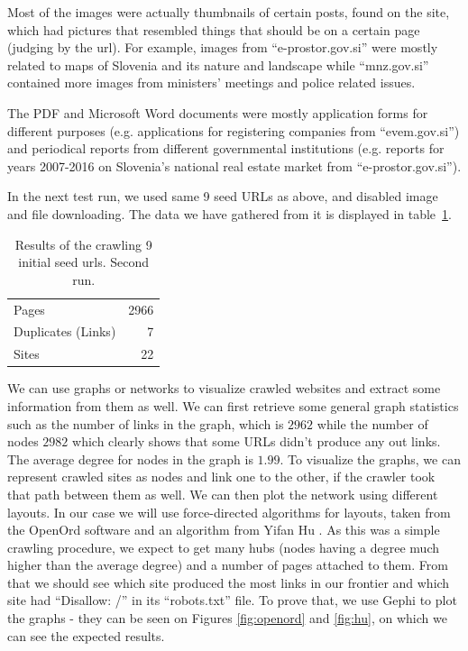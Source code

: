 \documentclass[9pt]{IEEEtran}
\begin{document}
Most of the images were actually thumbnails of certain posts, found on the site, which had pictures that resembled things that should be on a certain page (judging by the url).
For example, images from ``e-prostor.gov.si'' were mostly related to maps of Slovenia and its nature and landscape while ``mnz.gov.si'' contained more images from ministers' meetings and police related issues.

The PDF and Microsoft Word documents were mostly application forms for different purposes (e.g. applications for registering companies from ``evem.gov.si'') and periodical reports from different governmental institutions (e.g. reports for years 2007-2016 on Slovenia's national real estate market from ``e-prostor.gov.si'').

In the next test run, we used same 9 seed URLs as above, and disabled image and file downloading. The data we have gathered from it is displayed in table~\ref{tab:results2}.
\begin{table}[H]
    \begin{center}
    \caption{Results of the crawling 9 initial seed urls. Second run.}
        \begin{tabular}{ l | r }
        Pages & 2966 \\
        Duplicates (Links) & 7 \\
        Sites & 22 \\
        \end{tabular}
    \label{tab:results2}
    \end{center}
\end{table}



We can use graphs or networks to visualize crawled websites and extract some information from them as well.
We can first retrieve some general graph statistics such as the number of links in the graph, which is $2962$ while the number of nodes $2982$ which clearly shows that some URLs didn't produce any out links.
The average degree for nodes in the graph is $1.99$.
To visualize the graphs, we can represent crawled sites as nodes and link one to the other, if the crawler took that path between them as well.
We can then plot the network using different layouts.
In our case we will use force-directed algorithms for layouts, taken from the OpenOrd software \cite{Martin2011} and an algorithm from Yifan Hu \cite{Hu2005}.
As this was a simple crawling procedure, we expect to get many hubs (nodes having a degree much higher than the average degree) and a number of pages attached to them.
From that we should see which site produced the most links in our frontier and which site had ``Disallow: /'' in its ``robots.txt'' file.
To prove that, we use Gephi to plot the graphs - they can be seen on Figures \ref{fig:openord} and \ref{fig:hu}, on which we can see the expected results.
\end{document}
